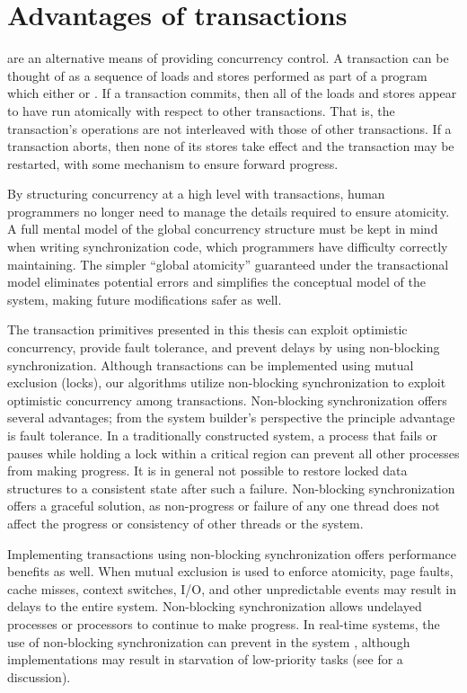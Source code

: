 \section{Advantages of transactions}

 are
an alternative means of providing concurrency control.
A transaction can be thought of as a sequence of loads and stores
performed as part of a program which either
 or .  If a transaction
commits, then all of the loads and stores appear to have run
atomically with respect to other transactions.  That is, the
transaction's operations are not interleaved with those of other
transactions.  If a transaction aborts, then none of its stores take
effect and the transaction may be restarted, with some mechanism to
ensure forward progress.

By structuring concurrency at a high level with transactions, human
programmers no longer need to manage the details required to ensure
atomicity.  A full mental model of the global concurrency structure
must be kept in mind when writing synchronization code, which
programmers have difficulty correctly maintaining.
The simpler ``global atomicity'' guaranteed under the
transactional model eliminates potential errors and simplifies the conceptual
model of the system, making future modifications safer as
well.

The transaction primitives presented in this thesis can exploit
optimistic concurrency, provide fault tolerance, and prevent delays by
using non-blocking synchronization.  Although transactions can be
implemented using mutual exclusion (locks), our algorithms
utilize non-blocking synchronization 
\cite{Lamport77,Herlihy88,HerlihyLuMo03,MassalinPu91,GreenwaldCh96} to
exploit optimistic concurrency among transactions.  Non-blocking
synchronization offers several advantages; from the system
builder's perspective the principle advantage is fault tolerance.
In a traditionally constructed system, a process that
fails or pauses while holding a lock within a critical region can
prevent all other processes from making progress.  It is in general
not possible to restore locked data structures to a
consistent state after such a failure.  Non-blocking synchronization
offers a graceful solution, as non-progress or failure
of any one thread does not affect the progress or consistency of other
threads or the system.

Implementing transactions using
non-blocking synchronization offers performance benefits as well.
When mutual exclusion is used to enforce atomicity, page
faults, cache misses, context
switches, I/O, and other unpredictable events may result in delays to the
entire system. Non-blocking
synchronization allows undelayed processes or processors to continue
to make progress.
In real-time systems, the use of non-blocking
synchronization can prevent 
 in the system
\cite{Jones97}, although \naive implementations may result in
starvation of low-priority tasks (see  for a discussion).

